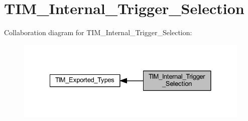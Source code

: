 \hypertarget{group___t_i_m___internal___trigger___selection}{}\section{T\+I\+M\+\_\+\+Internal\+\_\+\+Trigger\+\_\+\+Selection}
\label{group___t_i_m___internal___trigger___selection}
Collaboration diagram for T\+I\+M\+\_\+\+Internal\+\_\+\+Trigger\+\_\+\+Selection\+:
\nopagebreak
\begin{figure}[H]
\begin{center}
\leavevmode
\includegraphics[width=328pt]{group___t_i_m___internal___trigger___selection}
\end{center}
\end{figure}
